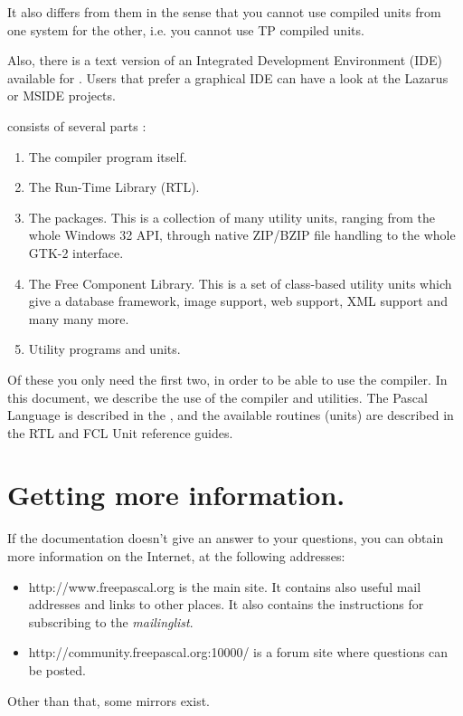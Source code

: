 It also differs from them in the sense that you cannot use compiled units
from one system for the other, i.e. you cannot use TP compiled units.

Also, there is a text version of an Integrated Development Environment (IDE) 
available for \fpc. Users that prefer a graphical IDE can have a look at the
Lazarus or MSIDE projects.

\fpc consists of several parts :
\begin{enumerate}
\item The compiler program itself.
\item The Run-Time Library (RTL).
\item The packages. This is a collection of many utility units, ranging from
the whole Windows 32 API, through native ZIP/BZIP file handling to the whole GTK-2 interface.
\item The Free Component Library. This is a set of class-based utility units which give
a database framework, image support, web support, XML support and many many more.
\item Utility programs and units.
\end{enumerate}

Of these you only need the first two, in order to be able to use the compiler.
In this document, we describe the use of the compiler and utilities. 
The Pascal Language is described in the , and the available routines
(units) are described in the RTL and FCL Unit reference guides.

\section{Getting more information.}
If the documentation doesn't give an answer to your questions,
you can obtain more information on the Internet, at the following addresses:
\begin{itemize}
\item
{}
{http://www.freepascal.org} is the main
site. It contains also useful mail addresses and
links to other places.
It also contains the instructions for subscribing to the
\textit{mailinglist}.

\item
{}
{http://community.freepascal.org:10000/} is a forum site where
questions can be posted.
\end{itemize}
Other than that, some mirrors exist.

